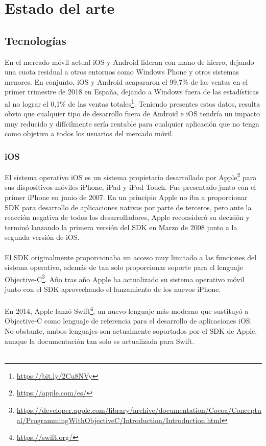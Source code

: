 \documentclass[a4paper, 12pt]{article}
\begin{document}
\section{Estado del arte}
\label{sec-2}
\subsection{Tecnologías}
\label{sec-2-1}
En el mercado móvil actual iOS y Android lideran con mano de hierro, dejando una cuota residual a otros
entornos como Windows Phone y otros sistemas menores. En conjunto, iOS y Android acapararon el 99,7\% de
las ventas en el primer trimestre de 2018 en España, dejando a Windows fuera de las estadísticas al no lograr
el 0,1\% de las ventas totales\footnote{\url{https://bit.ly/2Cu8NVy}}. Teniendo presentes estos datos, resulta obvio que cualquier tipo de desarrollo
fuera de Android e iOS tendría un impacto muy reducido y difícilmente sería rentable para cualquier aplicación
que no tenga como objetivo a todos los usuarios del mercado móvil.
\subsubsection{iOS}
\label{sec-2-1-1}
El sistema operativo iOS es un sistema propietario desarrollado por Apple\footnote{\url{https://apple.com/es/}} para sus dispositivos
móviles iPhone, iPad y iPod Touch. Fue presentado junto con el primer iPhone en junio de 2007. En un
principio Apple no iba a proporcionar SDK para desarrollo de aplicaciones nativas por parte de terceros,
pero ante la reacción negativa de todos los desarrolladores, Apple reconsideró su decisión y terminó
lanzando la primera versión del SDK en Marzo de 2008 junto a la segunda versión de iOS.
\\
\\
El SDK originalmente proporcionaba un acceso muy limitado a las funciones del sistema operativo,
además de tan solo proporcionar soporte para el lenguaje Objective-C\footnote{\url{https://developer.apple.com/library/archive/documentation/Cocoa/Conceptual/ProgrammingWithObjectiveC/Introduction/Introduction.html}}. Año tras año Apple ha
actualizado su sistema operativo móvil junto con el SDK aprovechando el lanzamiento de los nuevos iPhone.
\\
\\
En 2014, Apple lanzó Swift\footnote{\url{https://swift.org/}}, un nuevo lenguaje más moderno que sustituyó a Objective-C como
lenguaje de referencia para el desarrollo de aplicaciones iOS. No obstante, ambos lenguajes son actualmente
soportados por el SDK de Apple, aunque la documentación tan solo es actualizada para Swift.
\\
\\
\end{document}

